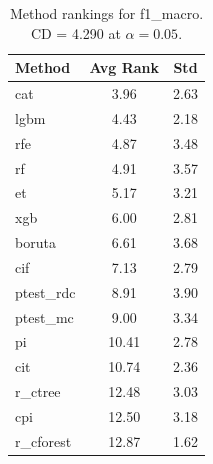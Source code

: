 \begin{table}[h]
\centering
\caption{Method rankings for f1_macro. CD = 4.290 at $\alpha=0.05$.}
\label{tab:ranks_f1_macro}
\begin{tabular}{lcc}
\toprule
Method & Avg Rank & Std \\
\midrule
cat & 3.96 & 2.63 \\
lgbm & 4.43 & 2.18 \\
rfe & 4.87 & 3.48 \\
rf & 4.91 & 3.57 \\
et & 5.17 & 3.21 \\
xgb & 6.00 & 2.81 \\
boruta & 6.61 & 3.68 \\
cif & 7.13 & 2.79 \\
ptest_rdc & 8.91 & 3.90 \\
ptest_mc & 9.00 & 3.34 \\
pi & 10.41 & 2.78 \\
cit & 10.74 & 2.36 \\
r_ctree & 12.48 & 3.03 \\
cpi & 12.50 & 3.18 \\
r_cforest & 12.87 & 1.62 \\
\bottomrule
\end{tabular}
\end{table}